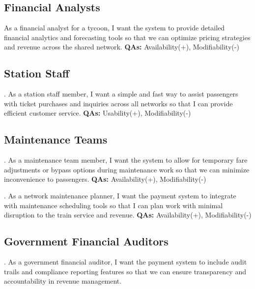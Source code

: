 \subsection{Financial Analysts}

\noindent
As a financial analyst for a tycoon, I want the system to provide detailed financial analytics and forecasting tools so that we can optimize pricing strategies and revenue across the shared network. \textbf{QAs:} Availability(+), Modifiability(-)

\subsection*{Station Staff}

. As a station staff member, I want a simple and fast way to assist passengers with ticket purchases and inquiries across all networks so that I can provide efficient customer service. \textbf{QAs:} Usability(+), Modifiability(-)

\subsection{Maintenance Teams}

. As a maintenance team member, I want the system to allow for temporary fare adjustments or bypass options during maintenance work so that we can minimize inconvenience to passengers. \textbf{QAs:} Availability(+), Modifiability(-)

. As a network maintenance planner, I want the payment system to integrate with maintenance scheduling tools so that I can plan work with minimal disruption to the train service and revenue. \textbf{QAs:} Availability(+), Modifiability(-)

\subsection{Government Financial Auditors}

. As a government financial auditor, I want the payment system to include audit trails and compliance reporting features so that we can ensure transparency and accountability in revenue management.